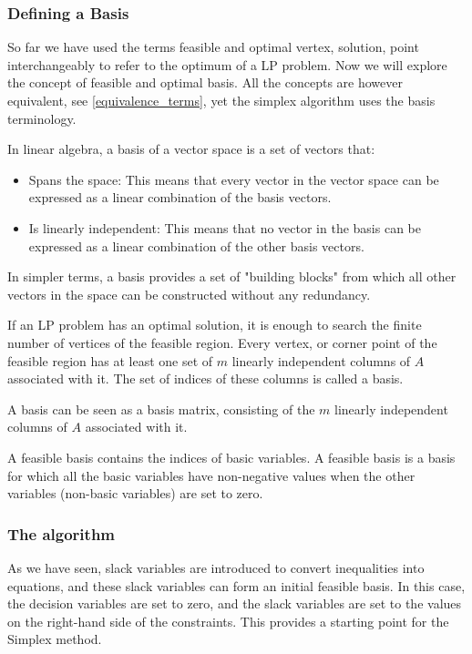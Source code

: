 \subsubsection{Defining a Basis}
So far we have used the terms feasible and optimal vertex, solution, point interchangeably to refer 
to the optimum of a LP problem. Now we will explore the concept of feasible and optimal basis. All the
concepts are however equivalent, see \ref{equivalence_terms}, yet the simplex algorithm uses the 
basis terminology.

In  linear algebra, a basis of a vector space is a set of vectors that:
\begin{itemize}
    \item Spans the space: This means that every vector in the vector space 
    can be expressed as a linear combination of the basis vectors.
    \item Is linearly independent: This means that no vector in the basis can be 
    expressed as a linear combination of the other basis vectors.
\end{itemize}

In simpler terms, a basis provides a set of "building blocks" from which all other vectors in the 
space can be constructed without any redundancy.

If an LP problem has an optimal solution, it is enough to search the finite number
of vertices of the feasible region. Every vertex, or corner point of the feasible region has at least
one set of $m$ linearly independent columns of $A$ associated with it. The set of indices
of these columns is called a basis. 

A basis can be seen as a basis matrix, consisting of the 
$m$ linearly independent columns of $A$ associated with it. 

A feasible basis contains the indices of basic
variables. A feasible basis is a basis for which all the basic variables have 
non-negative values when the other variables (non-basic variables) are set to zero.


\subsubsection{The algorithm}
As we have seen, slack variables are introduced to convert inequalities 
into equations, and these slack variables can form an initial feasible basis. 
In this case, the decision variables are set to zero, and the slack variables are set to 
the values on the right-hand side of the constraints.
 This provides a starting point for the Simplex method.

